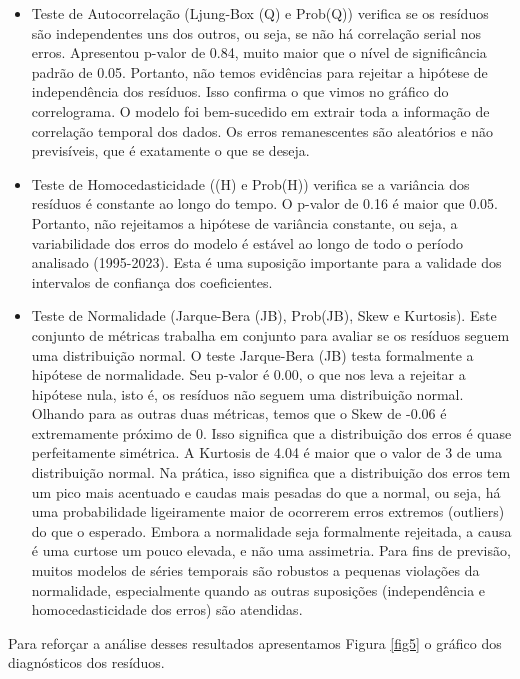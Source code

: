 \documentclass[ 12pt,a4paper ]{article} %
\begin{document}
	\begin{itemize}
		\item Teste de Autocorrelação (Ljung-Box (Q) e Prob(Q)) verifica se os resíduos são independentes uns dos outros, ou seja, se não há correlação serial nos erros. Apresentou 
		 p-valor de 0.84, muito maior que o nível de significância padrão de 0.05. Portanto, não temos evidências para rejeitar a hipótese de independência dos resíduos.
		Isso confirma o que vimos no gráfico do correlograma. O modelo foi bem-sucedido em extrair toda a informação de correlação temporal dos dados. Os erros remanescentes são aleatórios e não previsíveis, que é exatamente o que se deseja.
		
		\item  Teste de Homocedasticidade ((H) e Prob(H)) verifica se a variância dos resíduos é constante ao longo do tempo. O p-valor de 0.16 é maior que 0.05. Portanto, não rejeitamos a hipótese de variância constante, ou seja, a variabilidade dos erros do modelo é estável ao longo de todo o período analisado (1995-2023). Esta é uma suposição importante para a validade dos intervalos de confiança dos coeficientes.
		
		\item Teste de Normalidade (Jarque-Bera (JB), Prob(JB), Skew e Kurtosis). Este conjunto de métricas trabalha em conjunto para avaliar se os resíduos seguem uma distribuição normal.
		O teste Jarque-Bera (JB) testa formalmente a hipótese de normalidade. Seu p-valor é 0.00, o que nos leva a rejeitar a hipótese nula, isto é, os resíduos não seguem uma distribuição normal. Olhando para as outras duas métricas, temos que o Skew de -0.06 é extremamente próximo de 0. Isso significa que a distribuição dos erros é quase perfeitamente simétrica. A Kurtosis de 4.04 é maior que o valor de 3 de uma distribuição normal. Na prática, isso significa que a distribuição dos erros tem um pico mais acentuado e caudas mais pesadas do que a normal, ou seja, há uma probabilidade ligeiramente maior de ocorrerem erros extremos (outliers) do que o esperado.
		Embora a normalidade seja formalmente rejeitada, a causa é uma curtose um pouco elevada, e não uma assimetria. Para fins de previsão, muitos modelos de séries temporais são robustos a pequenas violações da normalidade, especialmente quando as outras suposições (independência e homocedasticidade dos erros) são atendidas.
		
		
	\end{itemize}
	
	Para reforçar a análise desses resultados apresentamos Figura \ref{fig5} o gráfico dos diagnósticos dos resíduos.
	
\end{document}
